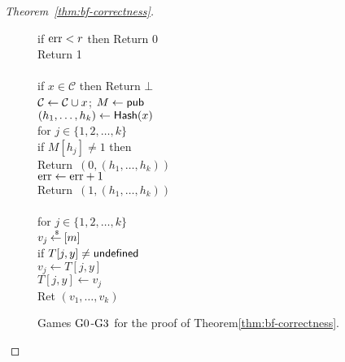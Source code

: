 \begin{proof}[Theorem~\ref{thm:bf-correctness}]
\begin{figure}[tp]
{{if $\mathrm{err}  < r$ then Return 0\\
Return 1\\ 
%
\\
if $x \in \mathcal{C}$ then Return $\bot$\\
${\cal C} \gets {\cal C} \cup x$; $M \gets{\sf pub}$\\
$(h_1, \ldots, h_{k}) \gets \mathsf{Hash}(x)$\\
for $j \in \{1,2,\ldots,k\}$\\
\nudge if $M[h_j] \neq 1$ then \\
\nudge \nudge Return~$(0, (h_1, \ldots, h_{k}) )$\\
$\mathrm{err} \gets \mathrm{err} +1$\\
Return~$(1, (h_1, \ldots, h_{k}) )$\\
%
\\
for $j \in \{1,2,\ldots,k\}$\\
\nudge $v_j {\:\stackrel{{\scriptscriptstyle \hspace{0.2em}\$}} {\leftarrow}\:} [m]$\\
\nudge if $T[j,y] \neq \mathsf{undefined}$\\
\nudge \nudge $v_j \gets T[j,y]$\\
\nudge $T[j,y] \gets v_j$\\
Ret $\left(v_1,\ldots,v_k\right)$
}
}
\caption{Games $\text{G0}$-$\text{G3}$ for the
proof of Theorem\ref{thm:bf-correctness}.}
\label{fig:bf-correctness-games1}
\end{figure}
\begin{figure}[tp]
\end{figure}
\end{proof}
